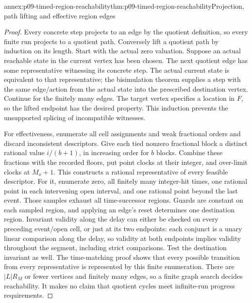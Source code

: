 \begin{annexitem}{annex:p09-timed-region-reachability}{thm:p09-timed-region-reachability}{Projection, path lifting and effective region edges}
\begin{proof}
Every concrete step projects to an edge by the quotient definition, so
every finite run projects to a quotient path. Conversely lift a quotient
path by induction on its length. Start with the actual zero valuation.
Suppose an actual reachable state in the current vertex has been chosen.
The next quotient edge has some representative witnessing its concrete
step. The actual current state is equivalent to that representative;
the bisimulation theorem supplies a step with the same edge/action from
the actual state into the prescribed destination vertex. Continue for the
finitely many edges. The target vertex specifies a location in \(F\),
so the lifted endpoint has the desired property. This induction prevents
the unsupported splicing of incompatible witnesses.

For effectiveness, enumerate all cell assignments and weak fractional
orders and discard inconsistent descriptors. Give each tied nonzero
fractional block a distinct rational value \(i/(b+1)\), in increasing
order for \(b\) blocks. Combine these fractions with the recorded floors,
put point clocks at their integer, and over-limit clocks at \(M_x+1\).
This constructs a rational representative of every feasible descriptor.
For it, enumerate zero, all finitely many integer-hit times, one rational
point in each intervening open interval, and one rational point beyond
the last event. Those samples exhaust all time-successor regions.
Guards are constant on each sampled region, and applying an edge's reset
determines one destination region. Invariant validity along the delay can
either be checked on every preceding event/open cell, or just at its two
endpoints: each conjunct is a unary linear comparison along the delay,
so validity at both endpoints implies validity throughout the segment,
including strict comparisons. Test the destination invariant as well.
The time-matching proof shows that every possible transition from every
representative is represented by this finite enumeration. There are
\(|L|R_M\) or fewer vertices and finitely many edges, so a finite graph
search decides reachability. It makes no claim that quotient cycles meet
infinite-run progress requirements.
\end{proof}
\end{annexitem}

